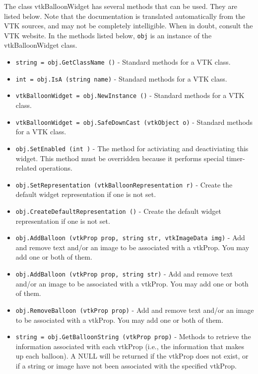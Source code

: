 The class vtkBalloonWidget has several methods that can be used.
  They are listed below.
Note that the documentation is translated automatically from the VTK sources,
and may not be completely intelligible.  When in doubt, consult the VTK website.
In the methods listed below, \verb|obj| is an instance of the vtkBalloonWidget class.
\begin{itemize}
\item  \verb|string = obj.GetClassName ()| -  Standard methods for a VTK class.

\item  \verb|int = obj.IsA (string name)| -  Standard methods for a VTK class.

\item  \verb|vtkBalloonWidget = obj.NewInstance ()| -  Standard methods for a VTK class.

\item  \verb|vtkBalloonWidget = obj.SafeDownCast (vtkObject o)| -  Standard methods for a VTK class.

\item  \verb|obj.SetEnabled (int )| -  The method for activiating and deactiviating this widget. This method
 must be overridden because it performs special timer-related operations.

\item  \verb|obj.SetRepresentation (vtkBalloonRepresentation r)| -  Create the default widget representation if one is not set. 

\item  \verb|obj.CreateDefaultRepresentation ()| -  Create the default widget representation if one is not set. 

\item  \verb|obj.AddBalloon (vtkProp prop, string str, vtkImageData img)| -  Add and remove text and/or an image to be associated with a vtkProp. You
 may add one or both of them. 

\item  \verb|obj.AddBalloon (vtkProp prop, string str)| -  Add and remove text and/or an image to be associated with a vtkProp. You
 may add one or both of them. 

\item  \verb|obj.RemoveBalloon (vtkProp prop)| -  Add and remove text and/or an image to be associated with a vtkProp. You
 may add one or both of them. 

\item  \verb|string = obj.GetBalloonString (vtkProp prop)| -  Methods to retrieve the information associated with each vtkProp (i.e.,
 the information that makes up each balloon). A NULL will be returned if
 the vtkProp does not exist, or if a string or image have not been
 associated with the specified vtkProp.


\end{itemize}
